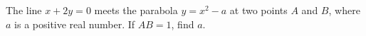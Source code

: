 The line $x+2y=0$ meets the parabola $y=x^2-a$ at two points $A$ and $B$, where $a$ is a positive real number. If $AB=1$, find $a$.
